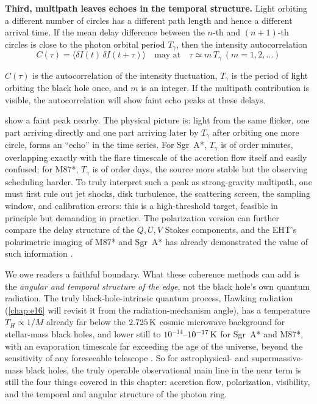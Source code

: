 \textbf{Third, multipath leaves echoes in the temporal structure.} Light orbiting a different number of circles has a different path length and hence a different arrival time. If the mean delay difference between the \(n\)-th and \((n+1)\)-th circles is close to the photon orbital period \(T_\gamma\), then the intensity autocorrelation
\begin{equation}
  C(\tau)=\big\langle\delta I(t)\,\delta I(t+\tau)\big\rangle
  \quad\text{may at}\quad
  \tau\simeq m\,T_\gamma\ (m=1,2,\dots)
  \label{eq:e19-echo}
\end{equation}
\begin{formulaexplain}
\(C(\tau)\) is the autocorrelation of the intensity fluctuation, \(T_\gamma\) is the period of light orbiting the black hole once, and \(m\) is an integer. If the multipath contribution is visible, the autocorrelation will show faint echo peaks at these delays.
\end{formulaexplain}
show a faint peak nearby. The physical picture is: light from the same flicker, one part arriving directly and one part arriving later by \(T_\gamma\) after orbiting one more circle, forms an ``echo'' in the time series. For Sgr~A*, \(T_\gamma\) is of order minutes, overlapping exactly with the flare timescale of the accretion flow itself and easily confused; for M87*, \(T_\gamma\) is of order days, the source more stable but the observing scheduling harder. To truly interpret such a peak as strong-gravity multipath, one must first rule out jet shocks, disk turbulence, the scattering screen, the sampling window, and calibration errors: this is a high-threshold target, feasible in principle but demanding in practice. The polarization version can further compare the delay structure of the \(Q,U,V\) Stokes components, and the EHT's polarimetric imaging of M87* and Sgr~A* has already demonstrated the value of such information \citep{2021ApJ...910L..13E,2021PhRvD.104d4049G,2022PhRvD.106d3021C}.

We owe readers a faithful boundary. What these coherence methods can add is the \emph{angular and temporal structure of the edge}, not the black hole's own quantum radiation. The truly black-hole-intrinsic quantum process, Hawking radiation (\ref{chap:e16} will revisit it from the radiation-mechanism angle), has a temperature \(T_H\propto1/M\) already far below the \(2.725\,{\rm K}\) cosmic microwave background for stellar-mass black holes, and lower still to \(10^{-14}\)--\(10^{-17}\,{\rm K}\) for Sgr~A* and M87*, with an evaporation timescale far exceeding the age of the universe, beyond the sensitivity of any foreseeable telescope \citep{1974Natur.248...30H,1975CMaPh..43..199H}. So for astrophysical- and supermassive-mass black holes, the truly operable observational main line in the near term is still the four things covered in this chapter: accretion flow, polarization, visibility, and the temporal and angular structure of the photon ring.


